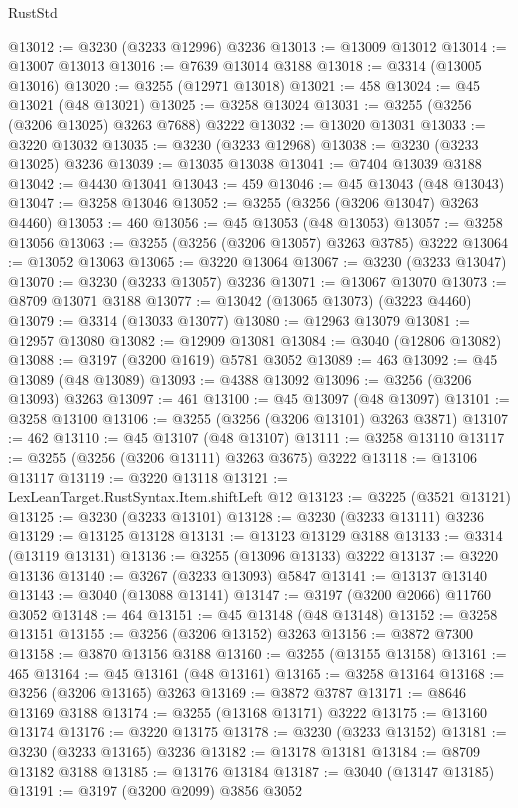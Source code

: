 \begin{lexlean}{RustStd}
\begin{coremodule}
{\begin{coremodule}
{{{{{{{{{{{{{{{{{{{{{{{{{{{{{{{{{{{{{@13012 := @3230 (@3233 @12996) @3236
@13013 := @13009 @13012
@13014 := @13007 @13013
@13016 := @7639 @13014 @3188
@13018 := @3314 (@13005 @13016)
@13020 := @3255 (@12971 @13018)
@13021 := 458
@13024 := @45 @13021 (@48 @13021)
@13025 := @3258 @13024
@13031 := @3255 (@3256 (@3206 @13025) @3263 @7688) @3222
@13032 := @13020 @13031
@13033 := @3220 @13032
@13035 := @3230 (@3233 @12968)
@13038 := @3230 (@3233 @13025) @3236
@13039 := @13035 @13038
@13041 := @7404 @13039 @3188
@13042 := @4430 @13041
@13043 := 459
@13046 := @45 @13043 (@48 @13043)
@13047 := @3258 @13046
@13052 := @3255 (@3256 (@3206 @13047) @3263 @4460)
@13053 := 460
@13056 := @45 @13053 (@48 @13053)
@13057 := @3258 @13056
@13063 := @3255 (@3256 (@3206 @13057) @3263 @3785) @3222
@13064 := @13052 @13063
@13065 := @3220 @13064
@13067 := @3230 (@3233 @13047)
@13070 := @3230 (@3233 @13057) @3236
@13071 := @13067 @13070
@13073 := @8709 @13071 @3188
@13077 := @13042 (@13065 @13073) (@3223 @4460)
@13079 := @3314 (@13033 @13077)
@13080 := @12963 @13079
@13081 := @12957 @13080
@13082 := @12909 @13081
@13084 := @3040 (@12806 @13082)
@13088 := @3197 (@3200 @1619) @5781 @3052
@13089 := 463
@13092 := @45 @13089 (@48 @13089)
@13093 := @4388 @13092
@13096 := @3256 (@3206 @13093) @3263
@13097 := 461
@13100 := @45 @13097 (@48 @13097)
@13101 := @3258 @13100
@13106 := @3255 (@3256 (@3206 @13101) @3263 @3871)
@13107 := 462
@13110 := @45 @13107 (@48 @13107)
@13111 := @3258 @13110
@13117 := @3255 (@3256 (@3206 @13111) @3263 @3675) @3222
@13118 := @13106 @13117
@13119 := @3220 @13118
@13121 := LexLeanTarget.RustSyntax.Item.shiftLeft @12
@13123 := @3225 (@3521 @13121)
@13125 := @3230 (@3233 @13101)
@13128 := @3230 (@3233 @13111) @3236
@13129 := @13125 @13128
@13131 := @13123 @13129 @3188
@13133 := @3314 (@13119 @13131)
@13136 := @3255 (@13096 @13133) @3222
@13137 := @3220 @13136
@13140 := @3267 (@3233 @13093) @5847
@13141 := @13137 @13140
@13143 := @3040 (@13088 @13141)
@13147 := @3197 (@3200 @2066) @11760 @3052
@13148 := 464
@13151 := @45 @13148 (@48 @13148)
@13152 := @3258 @13151
@13155 := @3256 (@3206 @13152) @3263
@13156 := @3872 @7300
@13158 := @3870 @13156 @3188
@13160 := @3255 (@13155 @13158)
@13161 := 465
@13164 := @45 @13161 (@48 @13161)
@13165 := @3258 @13164
@13168 := @3256 (@3206 @13165) @3263
@13169 := @3872 @3787
@13171 := @8646 @13169 @3188
@13174 := @3255 (@13168 @13171) @3222
@13175 := @13160 @13174
@13176 := @3220 @13175
@13178 := @3230 (@3233 @13152)
@13181 := @3230 (@3233 @13165) @3236
@13182 := @13178 @13181
@13184 := @8709 @13182 @3188
@13185 := @13176 @13184
@13187 := @3040 (@13147 @13185)
@13191 := @3197 (@3200 @2099) @3856 @3052
}}}}}}}}}}}}}}}}}}}}}}}}}}}}}}}}}}}}}
\end{coremodule}}
\end{coremodule}
\end{lexlean}
